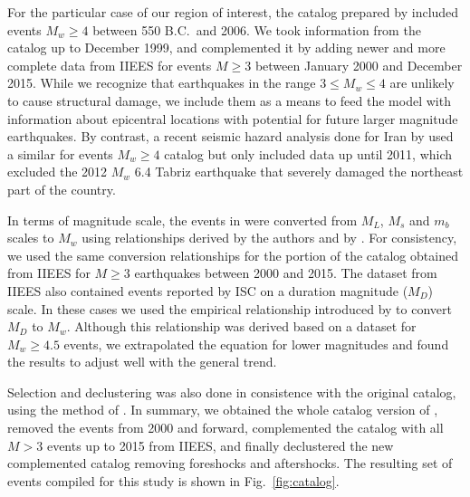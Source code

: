 For the particular case of our region of interest, the catalog prepared by \citet{Zare2014} included events $M_w \geq 4$ between 550 B.C.~and 2006. We took information from the catalog up to December 1999, and complemented it by adding newer and more complete data from IIEES for events $M \geq 3$ between January 2000 and December 2015. While we recognize that earthquakes in the range $3 \leq M_w \leq 4$ are unlikely to cause structural damage, we include them as a means to feed the model with information about epicentral locations with potential for future larger magnitude earthquakes. By contrast, a recent seismic hazard analysis done for Iran by \citet{Khodaverdian_2016_BSSA} used a similar for events $M_w \geq 4$ catalog but only included data up until 2011, which excluded the 2012 $M_w$ 6.4 Tabriz earthquake that severely damaged the northeast part of the country.

In terms of magnitude scale, the events in \citet{Zare2014} were converted from $M_L$, $M_s$ and $m_b$ scales to $M_w$ using relationships derived by the authors and by \citet{Escordilis_2006_JS}. For consistency, we used the same conversion relationships for the portion of the catalog obtained from IIEES for $M \geq 3$ earthquakes between 2000 and 2015. The dataset from IIEES also contained events reported by ISC on a duration magnitude ($M_D$) scale. In these cases we used the empirical relationship introduced by \citet{Deniz2010} to convert $M_D$ to $M_w$. Although this relationship was derived based on a dataset for $M_w \geq 4.5$ events, we extrapolated the equation for lower magnitudes and found the results to adjust well with the general trend. 

Selection and declustering was also done in consistence with the original catalog, using the method of \citet{Gardner1974}. In summary, we obtained the whole catalog version of \citet{Zare2014}, removed the events from 2000 and forward, complemented the catalog with all $M>3$ events up to 2015 from IIEES, and finally declustered the new complemented catalog removing foreshocks and aftershocks. The resulting set of events compiled for this study is shown in Fig.~\ref{fig:catalog}.
